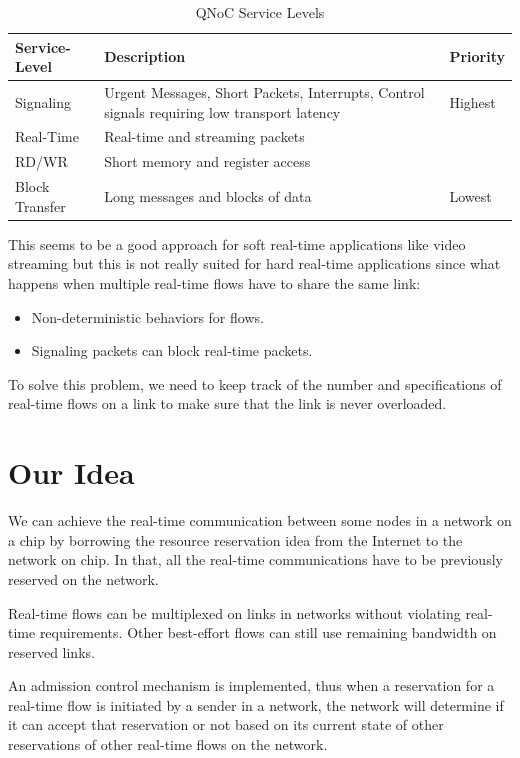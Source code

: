 \documentclass[a4]{article}
\begin{document}
\begin{table}[htbp]
\begin{center}
  \begin{tabular}{ | p{2.5cm} | p{6cm} | p{2cm} |}
    \hline
	Service-Level & Description & Priority \\ \hline
	Signaling & Urgent Messages, Short Packets, Interrupts, Control signals 
	requiring low transport latency & Highest \\ \hline
	Real-Time & Real-time and streaming packets & \\ \hline
	RD/WR & Short memory and register access & \\ \hline
	Block Transfer & Long messages and blocks of data & Lowest \\
    \hline
  \end{tabular}
\end{center}
\caption{QNoC Service Levels}
\label{table:QNoCTable}
\end{table}

This seems to be a good approach for soft real-time applications like video streaming
but this is not really suited for hard real-time applications since what happens 
when multiple real-time flows have to share the same link:
\begin{itemize}
\item Non-deterministic behaviors for flows.
\item Signaling packets can block real-time packets.
\end{itemize}
To solve this problem, we need to keep track of the number and specifications of
real-time flows on a link to make sure that the link is never overloaded.

\section{Our Idea}
We can achieve the real-time communication between some nodes in a network 
on a chip by borrowing the resource reservation idea \cite{Zhang93rsvp} from the 
Internet to the network on chip. In that, all the real-time communications 
have to be previously reserved on the network. 

Real-time flows can be multiplexed \cite{Ferrari90ascheme, Zhang_1service} on
links in networks without violating real-time requirements. Other best-effort
flows can still use remaining bandwidth on reserved links.

An admission control mechanism is implemented, thus when a reservation 
for a real-time flow is initiated by a sender in a network, the network will determine if 
it can accept that reservation or not based on its current state of other 
reservations of other real-time flows on the network.
\end{document}
